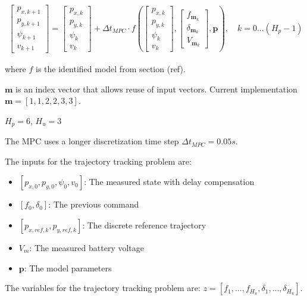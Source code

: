 \documentclass[12pt]{article}
\begin{document}
\begin{align*}
\begin{bmatrix}
p_{x,k+1}  \\
p_{y,k+1}  \\
\psi_{k+1}  \\
v_{k+1}  
\end{bmatrix}
= 
\begin{bmatrix}
p_{x,k}  \\
p_{y,k}  \\
\psi_{k}  \\
v_{k}  
\end{bmatrix}
+
\Delta t_{MPC} \cdot f\left(
\begin{bmatrix}
p_{x,k}  \\
p_{y,k}  \\
\psi_{k}  \\
v_{k}  
\end{bmatrix}
,  
\begin{bmatrix}
f_{\boldsymbol{m}_k}  \\
\delta_{\boldsymbol{m}_k}  \\
V_{\boldsymbol{m}_k} 
\end{bmatrix}
, \boldsymbol{p}\right), \quad k = 0 ... (H_p-1)
\end{align*}

where $f$ is the identified model from section (ref).

$\boldsymbol{m}$ is an index vector that allows reuse of input vectors. Current implementation $\boldsymbol{m} = [1, 1, 2, 2, 3, 3]$.

$H_p = 6$, $H_u = 3$

The MPC uses a longer discretization time step $\Delta t_{MPC} = 0.05s$. 

The inputs for the trajectory tracking problem are:

\begin{itemize}
\item $[p_{x,0}, p_{y,0}, \psi_{0}, v_{0}]$: The measured state with delay compensation
\item $[f_{0}, \delta_{0}]$: The previous command
\item $[p_{x,ref,k}, p_{y,ref,k}]$: The discrete reference trajectory
\item $V_m$: The measured battery voltage
\item $\boldsymbol{p}$: The model parameters
\end{itemize}


The variables for the trajectory tracking problem are: $z = [f_1, ..., f_{H_u}, \delta_1, ..., \delta_{H_u}]$.
\end{document}
